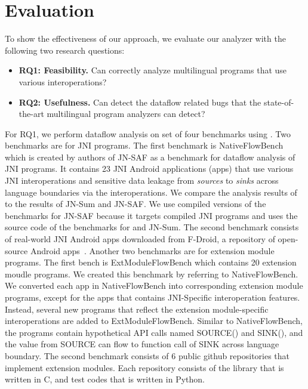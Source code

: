 \newcommand{\req}[1]{RQ#1}


\section{Evaluation}\label{sec:eval}

To show the effectiveness of our approach, we evaluate our analyzer
\ours with the following two research questions:
\begin{itemize}
  \item \textbf{\req{1}: Feasibility.} Can \ours correctly analyze multilingual programs that use
    various interoperations?

  \item \textbf{\req{2}: Usefulness.} Can \ours detect the dataflow related bugs that
    the state-of-the-art multilingual program analyzers can detect?
\end{itemize}

For \req{1}, we perform dataflow analysis on set of four benchmarks using \ours.
Two benchmarks are for JNI programs.
The first benchmark is NativeFlowBench~\cite{nativeflowbench,
JN-SAF} which is created by authors of JN-SAF as a benchmark for
dataflow analysis of JNI programs. It contains 23 JNI Android applications (apps) that
use various JNI interoperations and sensitive data leakage from {\it sources} to
{\it sinks} across language boundaries via the interoperations.
We compare
the analysis results of \ours to the results of JN-Sum and JN-SAF. We use
compiled versions of the benchmarks for JN-SAF because it targets compiled JNI
programs and uses the source code of the benchmarks for \ours and JN-Sum.
The second benchmark consists of real-world JNI Android apps downloaded from F-Droid, a repository of
open-source Android apps~\cite{fdroid}.
Another two benchmarks are for extension module programs.
The first bench is ExtModuleFlowBench which contains 20
extension moudle programs. We created this benchmark by
referring to NativeFlowBench. We converted each app in 
NativeFlowBench into corresponding extension module programs, except for
the apps that contains JNI-Specific interoperation features. Instead, several new programs
that reflect the extension module-specific interoperations are added to ExtModuleFlowBench.
Similar to NativeFlowBench, the programs contain hypothetical API calls
named SOURCE() and SINK(), and the value from SOURCE can flow to function
call of SINK across language boundary.
The second benchmark consists of 6 public github repositories that implement extension modules.
Each repository consists of the library that is written in C, and test codes that is written in Python.

